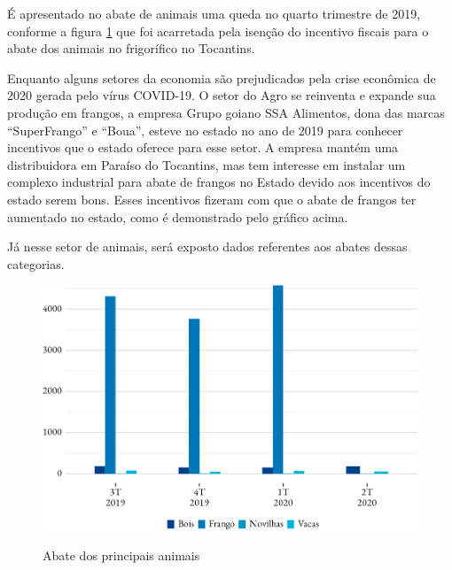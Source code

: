 \par É apresentado no abate de animais uma queda no quarto trimestre de 2019, conforme a figura \ref{fig:abate} que foi acarretada pela isenção do incentivo fiscais para o abate dos animais no frigorífico no Tocantins.

\par Enquanto alguns setores da economia são prejudicados pela crise econômica de 2020 gerada pelo vírus COVID-19. O setor do Agro se reinventa e expande sua produção em frangos, a empresa Grupo goiano SSA Alimentos, dona das marcas “SuperFrango” e “Boua”, esteve no estado no ano de 2019 para conhecer incentivos que o estado oferece para esse setor. A empresa mantém uma distribuidora em Paraíso do Tocantins, mas tem interesse em instalar um complexo industrial para abate de frangos no Estado devido aos incentivos do estado serem bons. Esses incentivos fizeram com que o abate de frangos ter aumentado no estado, como é demonstrado pelo gráfico acima.


\par Já nesse setor de animais, será exposto dados referentes aos abates dessas categorias.

\begin{figure}[!h]
	\caption{Abate dos principais animais}
	\includegraphics{fig/abates-1.pdf}
	\label{fig:abate}
\end{figure}
